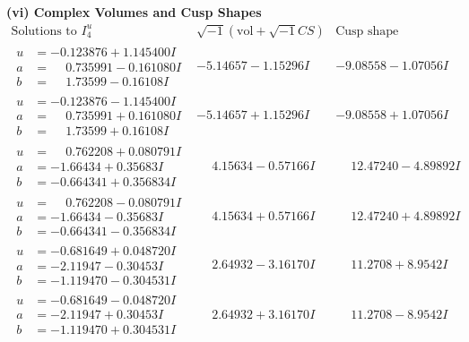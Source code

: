 \documentclass[1p]{elsarticle_modified}
\theoremstyle{definition}
\newcommand{\I}{\sqrt{-1}}
\begin{document}
\newpage\flushleft \textbf{(vi) Complex Volumes and Cusp Shapes}
$$\begin{array}{c|c|c}  
\text{Solutions to }I^u_{4}& \I (\text{vol} + \sqrt{-1}CS) & \text{Cusp shape}\\
 \hline 
\begin{aligned}
u &= -0.123876 + 1.145400 I \\
a &= \phantom{-}0.735991 - 0.161080 I \\
b &= \phantom{-}1.73599 - 0.16108 I\end{aligned}
 & -5.14657 - 1.15296 I & -9.08558 - 1.07056 I \\ \hline\begin{aligned}
u &= -0.123876 - 1.145400 I \\
a &= \phantom{-}0.735991 + 0.161080 I \\
b &= \phantom{-}1.73599 + 0.16108 I\end{aligned}
 & -5.14657 + 1.15296 I & -9.08558 + 1.07056 I \\ \hline\begin{aligned}
u &= \phantom{-}0.762208 + 0.080791 I \\
a &= -1.66434 + 0.35683 I \\
b &= -0.664341 + 0.356834 I\end{aligned}
 & \phantom{-}4.15634 - 0.57166 I & \phantom{-}12.47240 - 4.89892 I \\ \hline\begin{aligned}
u &= \phantom{-}0.762208 - 0.080791 I \\
a &= -1.66434 - 0.35683 I \\
b &= -0.664341 - 0.356834 I\end{aligned}
 & \phantom{-}4.15634 + 0.57166 I & \phantom{-}12.47240 + 4.89892 I \\ \hline\begin{aligned}
u &= -0.681649 + 0.048720 I \\
a &= -2.11947 - 0.30453 I \\
b &= -1.119470 - 0.304531 I\end{aligned}
 & \phantom{-}2.64932 - 3.16170 I & \phantom{-}11.2708 + 8.9542 I \\ \hline\begin{aligned}
u &= -0.681649 - 0.048720 I \\
a &= -2.11947 + 0.30453 I \\
b &= -1.119470 + 0.304531 I\end{aligned}
 & \phantom{-}2.64932 + 3.16170 I & \phantom{-}11.2708 - 8.9542 I \\ \hline\begin{aligned}

\end{aligned}
\end{array}$$
\end{document}
